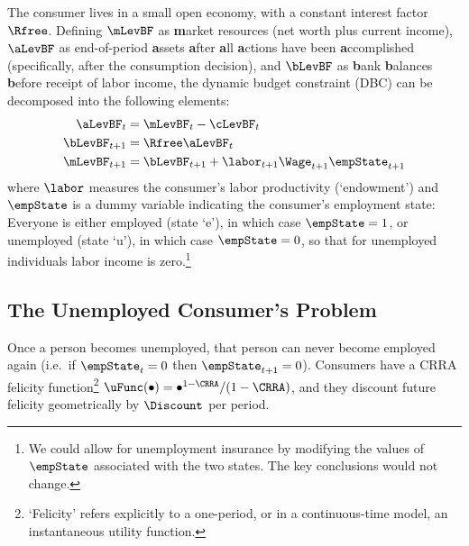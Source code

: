 \documentclass{handout}
\begin{document}
The consumer lives in a small open economy, with a constant interest factor $\Rfree$.  Defining $\mLevBF$ as
\textbf{m}arket resources (net worth plus current income), $\aLevBF$ as
end-of-period \textbf{a}ssets \textbf{a}fter \textbf{a}ll \textbf{a}ctions have been \textbf{a}ccomplished
(specifically, after the consumption decision), and $\bLevBF$ as \textbf{b}ank
\textbf{b}alances \textbf{b}efore receipt of labor income, the dynamic budget constraint (DBC) can be decomposed into the
following elements:
\begin{equation}\begin{gathered}\begin{aligned}
    \aLevBF_{t} & =  \mLevBF_{t}-\cLevBF_{t}
\\  \bLevBF_{t+1} & =  \Rfree \aLevBF_{t}
\\  \mLevBF_{t+1} & =  \bLevBF_{t+1}+\labor_{t+1}\Wage_{t+1}\empState_{t+1}  \label{eq:DBC}
\end{aligned}\end{gathered}\end{equation}
where $\labor$ measures the consumer's labor productivity
(`endowment') and $\empState$ is a dummy variable indicating the
consumer's employment state: Everyone is either
employed (state `e'), in which case $\empState = 1$, or unemployed
(state `u'), in which case $\empState=0$, so that for unemployed
individuals labor income is zero.\footnote{We could allow for
  unemployment insurance by modifying the values of $\empState$
  associated with the two states.  The key conclusions would not
  change.}

\pagebreak 
\subsection{The Unemployed Consumer's Problem} \label{subsec:Fred}

Once a person becomes unemployed, that person can never become
employed again (i.e.\ if $\empState_{t}=0$ then $\empState_{t+1}=0$).
Consumers have a CRRA felicity function\footnote{`Felicity' refers
  explicitly to a one-period, or in a continuous-time model, an
  instantaneous utility function.}
$\uFunc(\bullet)= \bullet^{1-\CRRA}/(1-\CRRA)$, and they discount
future felicity geometrically by $\Discount$ per period.
\end{document}
